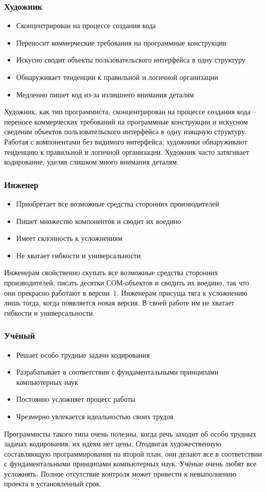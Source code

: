 \documentclass{../industrial-development}
\begin{document}
\begin{frame} \frametitle{Художник}
	 \begin{itemize}
                     \item Сконцентрирован на процессе создания кода
		\item Переносит коммерческие требования на программные конструкции
 		\item Искусно сводит объекты пользовательского интерфейса в одну структуру
 		\item Обнаруживает тенденции к правильной и логичной организации
		\item Медленно пишет код из-за излишнего внимания деталям
		\end{itemize}
\end{frame}
\lecturenotes
Художник, как тип программиста, сконцентрирован на процессе создания кода – переносе коммерческих требований на программные конструкции и искусном сведении объектов пользовательского интерфейса в одну изящную структуру. Работая с компонентами без видимого интерфейса, художники обнаруживают тенденцию к правильной и логичной организации. 
Художник часто затягивает кодирование, уделяя слишком много внимания деталям.

\begin{frame} \frametitle{Инженер}
 \begin{itemize}
                     \item Приобретает все возможные средства сторонних производителей
		\item Пишет множество компонентов и сводит их воедино
 		\item Имеет склонность к усложнениям
 		\item Не хватает гибкости и универсальности
		\end{itemize}
\end{frame}
\lecturenotes
	Инженерам свойственно скупать все возможные средства сторонних производителей, писать десятки СОМ-объектов и сводить их воедино, так что они прекрасно работают в версии~1.
Инженерам присуща тяга к усложнению лишь тогда, когда появляется новая версия. В своей работе им не хватает гибкости и универсальности.

\begin{frame} \frametitle{Учёный}
 \begin{itemize}
		\item Решает особо трудные задачи кодирования
                     \item Разрабатывает в соответствии с фундаментальными принципами компьютерных наук
		\item Постоянно усложняет процесс работы
		\item Чрезмерно увлекается идеальностью своих трудов
		\end{itemize}
\end{frame}
\lecturenotes
	Программисты такого типа очень полезны, когда речь заходит об особо трудных задачах кодирования, их идеям нет цены. Отодвигая художественную составляющую программирования на второй план, они делают все в соответствии с фундаментальными принципами компьютерных наук.
	 Учёные очень любят все усложнять. Полное отсутствие контроля может привести к невыполнению проекта в установленный срок.
\end{document}

